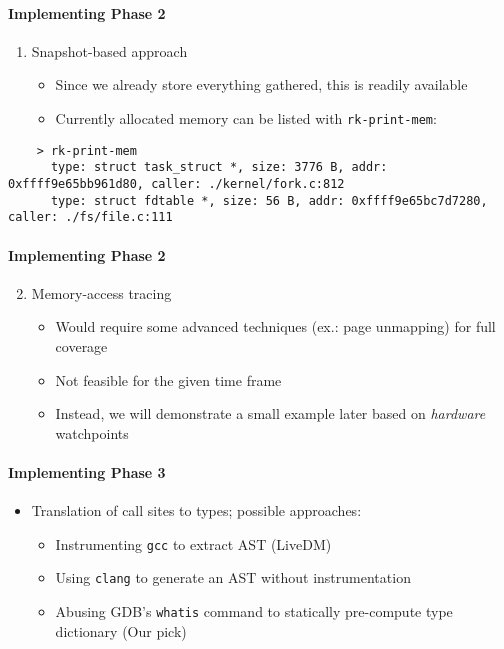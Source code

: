 \documentclass{i20lecture}
\begin{document}
\begin{frame}[fragile]{\insertsection}
  \framesubtitle{Implementing Phase 2}
    
    \begin{enumerate}
     \item Snapshot-based approach
\pause
     \begin{itemize}
      \item Since we already store everything gathered, this is readily available
\pause
      \item Currently allocated memory can be listed with \texttt{rk-print-mem}:
     \end{itemize}
    \end{enumerate}
    \begin{lstlisting}
    > rk-print-mem 
      type: struct task_struct *, size: 3776 B, addr: 0xffff9e65bb961d80, caller: ./kernel/fork.c:812
      type: struct fdtable *, size: 56 B, addr: 0xffff9e65bc7d7280, caller: ./fs/file.c:111
    \end{lstlisting}
\end{frame}

\begin{frame}[fragile]{\insertsection}
  \framesubtitle{Implementing Phase 2}
    
    \begin{enumerate}
     \setcounter{enumi}{1}
     \item Memory-access tracing
\pause
    \begin{itemize}
     \item Would require some advanced techniques (ex.: page unmapping) for full coverage
\pause
    \item Not feasible for the given time frame
\pause
    \item Instead, we will demonstrate a small example later based on \textit{hardware} watchpoints
    \end{itemize}
    \end{enumerate}
\end{frame}

\begin{frame}[fragile]{\insertsection}
  \framesubtitle{Implementing Phase 3}
    \begin{itemize}
     \item Translation of call sites to types; possible approaches:
     \begin{itemize}
\pause
      \item Instrumenting \texttt{gcc} to extract AST (LiveDM)
\pause
      \item Using \texttt{clang} to generate an AST without instrumentation
\pause
      \item Abusing GDB's \texttt{whatis} command to statically pre-compute type dictionary (Our pick)
     \end{itemize}
    \end{itemize}
\end{frame}
\end{document}
